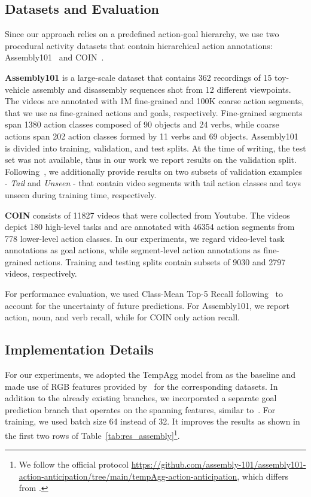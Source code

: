 \documentclass{article}
\begin{document}
\vspace{-0.25cm}
\subsection{Datasets and Evaluation}
\vspace{-0.1cm}
Since our approach relies on a predefined action-goal hierarchy,  we use two procedural activity datasets that contain hierarchical action annotations: Assembly101~\cite{sener2022assembly101} and COIN~\cite{tang2019coin}. 

\textbf{Assembly101} is a large-scale dataset that contains 362 recordings of 15 toy-vehicle assembly and disassembly sequences shot from 12 different viewpoints. The videos are annotated with 1M fine-grained and 100K coarse action segments, that we use as fine-grained actions and goals, respectively. Fine-grained segments span 1380 action classes composed of 90 objects and 24 verbs, while coarse actions span 202 action classes formed by 11 verbs and 69 objects. Assembly101 is divided into training, validation, and test splits. At the time of writing, the test set was not available, thus in our work we report results on the validation split. Following~\cite{sener2022assembly101}, we additionally provide results on two subsets of validation examples - \textit{Tail} and \textit{Unseen} - that contain video segments with tail action classes and toys unseen during training time, respectively.

\textbf{COIN} consists of 11827 videos that were collected from Youtube. The videos depict 180 high-level tasks and are annotated with 46354 action segments from 778 lower-level action classes. In our experiments, we regard video-level task annotations as goal actions, while segment-level action annotations as fine-grained actions. Training and testing splits contain subsets of 9030 and 2797 videos, respectively.

For performance evaluation, we used Class-Mean Top-5 Recall following~\cite{sener2022assembly101} to account for the uncertainty of future predictions. For Assembly101, we report action, noun, and verb recall, while for COIN only action recall.

\vspace{-0.25cm}
\subsection{Implementation Details}
\label{ssec:subhead}
\vspace{-0.1cm}
For our experiments, we adopted the TempAgg model from \cite{sener2022assembly101} as the baseline and made use of RGB features provided by~\cite{sener2022assembly101, tang2019coin} for the corresponding datasets. In addition to the already existing branches, we incorporated a separate goal prediction branch that operates on the spanning features, similar to~\cite{sener2020temporal}. For training, we used batch size 64 instead of 32. It improves the results as shown in the first two rows of Table~\ref{tab:res_assembly}\footnote{We follow the official protocol \url{https://github.com/assembly-101/assembly101-action-anticipation/tree/main/tempAgg-action-anticipation}, which differs from \cite{sener2022assembly101}.}. 
\end{document}
